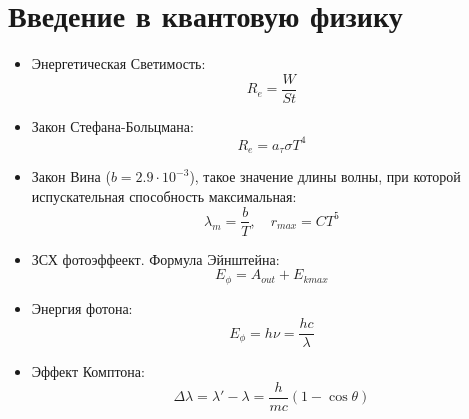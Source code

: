 \documentclass[twoside, a4paperpt, fleqn]{extarticle}
\begin{document}
    \section{Введение в квантовую физику}
    \begin{itemize}
        \item Энергетическая Светимость:
        \begin{equation*}
            R_e = \frac{W}{S t}
        \end{equation*}
        \item Закон Стефана-Больцмана:
        \begin{equation*}
            R_e = a_{\tau} \sigma T^4
        \end{equation*}
        \item Закон Вина ($b = 2.9 \cdot 10^{-3}$), такое значение длины волны, при которой испускательная способность максимальная:
        \begin{equation*}
            \lambda_m = \frac{b}{T}, \quad r_{max} = C T^5
        \end{equation*}
        \item ЗСХ фотоэффеект. Формула Эйнштейна:
        \begin{equation*}
            E_{\phi} = A_{out} + E_{k max}
        \end{equation*}
        \item Энергия фотона:
        \begin{equation}
            E_{\phi} = h \nu = \frac{h c}{\lambda }
        \end{equation}
        \item Эффект Комптона:
        \begin{equation*}
            \Delta \lambda = \lambda' - \lambda = \frac{h}{m c} (1 - \cos \theta)
        \end{equation*}
    \end{itemize}
\end{document}
